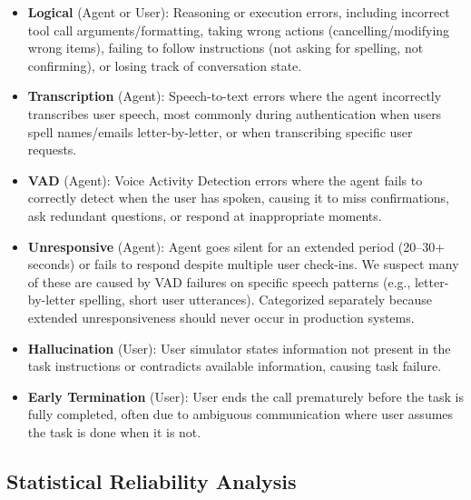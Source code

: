 \begin{itemize}[nosep,leftmargin=*]
    \item \textbf{Logical} (Agent or User): Reasoning or execution errors, including incorrect tool call arguments/formatting, taking wrong actions (cancelling/modifying wrong items), failing to follow instructions (not asking for spelling, not confirming), or losing track of conversation state.
    
    \item \textbf{Transcription} (Agent): Speech-to-text errors where the agent incorrectly transcribes user speech, most commonly during authentication when users spell names/emails letter-by-letter, or when transcribing specific user requests.
    
    \item \textbf{VAD} (Agent): Voice Activity Detection errors where the agent fails to correctly detect when the user has spoken, causing it to miss confirmations, ask redundant questions, or respond at inappropriate moments.
    
    \item \textbf{Unresponsive} (Agent): Agent goes silent for an extended period (20--30+ seconds) or fails to respond despite multiple user check-ins. We suspect many of these are caused by VAD failures on specific speech patterns (e.g., letter-by-letter spelling, short user utterances). Categorized separately because extended unresponsiveness should never occur in production systems.
    
    \item \textbf{Hallucination} (User): User simulator states information not present in the task instructions or contradicts available information, causing task failure.
    
    \item \textbf{Early Termination} (User): User ends the call prematurely before the task is fully completed, often due to ambiguous communication where user assumes the task is done when it is not.
\end{itemize}

\subsection{Statistical Reliability Analysis}
\label{app:stat-sig}

